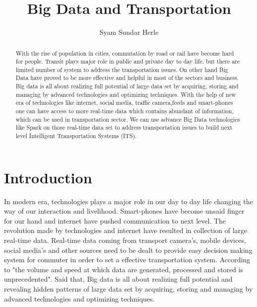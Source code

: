 \documentclass[sigconf]{acmart}
\begin{document}
\title{Big Data and Transportation}

\author{Syam Sundar Herle}

\begin{abstract}

With the rise of population in cities, commutation by road or rail have become hard for people. Transit plays major role in public and private day to day life, but there are limited number of system to address the transportation issues. On other hand Big Data have proved to be more effective and helpful in most of the sectors and business. Big data is all about realizing full potential of large data set by acquiring, storing and managing by advanced technologies and optimizing techniques. With the help of new era of technologies like internet, social media, traffic camera,feeds and smart-phones one can have access to more real-time data which contains abundant of information, which can be used in transportation sector. We can use advance Big Data technologies like Spark on those real-time data set to address transportation issues to build next level Intelligent Transportation Systems (ITS).
\end{abstract}


\maketitle

\section{Introduction}

In modern era, technologies plays a major role in our day to day life changing the way of our interaction and livelihood. Smart-phones have become unsaid finger for our hand and internet have pushed communication to next level. The revolution made by technologies and internet have resulted in collection of large real-time data. Real-time data coming from transport camera's, mobile devices, social media's and other sources need to be dealt to provide easy decision making system for commuter in order to set a effective transportation system. According to\cite{bdtrans} "the volume and speed at which data are generated, processed and stored is unprecedented". Said that, Big data is all about realizing full potential and revealing hidden patterns of large data set by acquiring, storing and managing by advanced technologies and optimizing techniques. 
\end{document}

